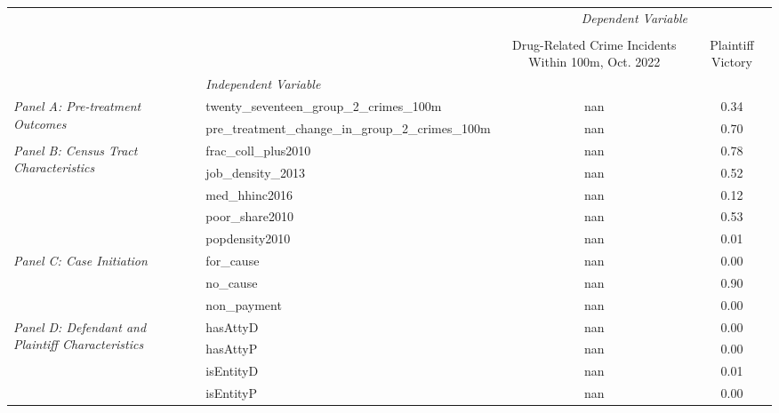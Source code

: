 \begin{tabular}{llcc}
\toprule
 &  & \multicolumn{2}{c}{\textit{Dependent Variable}} \\
\cline{3-4}
\\
 &  & Drug-Related Crime Incidents Within 100m, Oct. 2022 & Plaintiff Victory \\
 & \emph{Independent Variable} &  &  \\
\midrule
\multirow[c]{2}{3cm}{\textit{Panel A: Pre-treatment Outcomes}} & twenty_seventeen_group_2_crimes_100m & nan & 0.34 \\
 & pre_treatment_change_in_group_2_crimes_100m & nan & 0.70 \\
\cline{1-4}
\multirow[c]{5}{3cm}{\textit{Panel B: Census Tract Characteristics}} & frac_coll_plus2010 & nan & 0.78 \\
 & job_density_2013 & nan & 0.52 \\
 & med_hhinc2016 & nan & 0.12 \\
 & poor_share2010 & nan & 0.53 \\
 & popdensity2010 & nan & 0.01 \\
\cline{1-4}
\multirow[c]{3}{3cm}{\textit{Panel C: Case Initiation}} & for_cause & nan & 0.00 \\
 & no_cause & nan & 0.90 \\
 & non_payment & nan & 0.00 \\
\cline{1-4}
\multirow[c]{4}{3cm}{\textit{Panel D: Defendant and Plaintiff Characteristics}} & hasAttyD & nan & 0.00 \\
 & hasAttyP & nan & 0.00 \\
 & isEntityD & nan & 0.01 \\
 & isEntityP & nan & 0.00 \\
\cline{1-4}
\bottomrule
\end{tabular}
